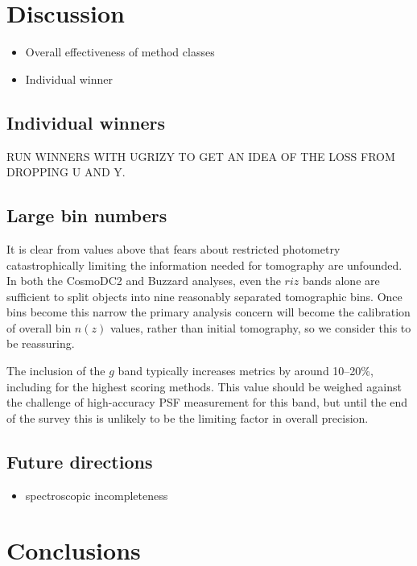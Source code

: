 \documentclass[twocolumn,twocolappendix]{aastex63}
\begin{document}
\section{Discussion}
\begin{itemize}
    \item Overall effectiveness of method classes
    \item Individual winner
\end{itemize}



\subsection{Individual winners}

RUN WINNERS WITH UGRIZY TO GET AN IDEA OF THE LOSS FROM DROPPING U AND Y.

\subsection{Large bin numbers}

It is clear from values above that fears about restricted photometry catastrophically limiting
the information needed for tomography are unfounded.  In both the CosmoDC2 and Buzzard analyses,
even the $riz$ bands alone are sufficient to split objects into nine reasonably separated
tomographic bins.
Once bins become this narrow the primary analysis concern will become the calibration of overall
bin $n(z)$ values, rather than initial tomography, so we consider this to be reassuring.

The inclusion of the $g$ band typically increases metrics by around 10--20\%, including for the
highest scoring methods.  This value should be weighed against the challenge of high-accuracy
PSF measurement for this band, but until the end of the survey this is unlikely to be
the limiting factor in overall precision.

\subsection{Future directions}

\begin{itemize}
    \item spectroscopic incompleteness
\end{itemize}

\section{Conclusions}
\end{document}
